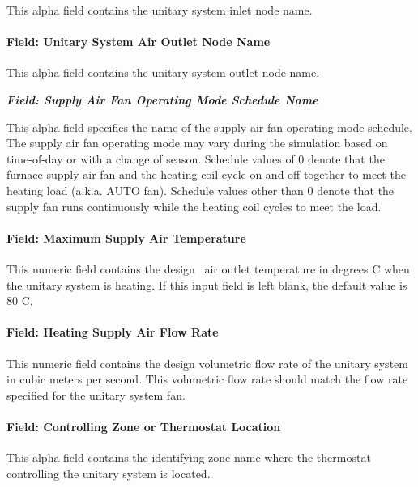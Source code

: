 This alpha field contains the unitary system inlet node name.

\paragraph{Field: Unitary System Air Outlet Node Name}\label{field-unitary-system-air-outlet-node-name-2}

This alpha field contains the unitary system outlet node name.

\textbf{\emph{Field: Supply Air Fan Operating Mode Schedule Name}}

This alpha field specifies the name of the supply air fan operating mode schedule. The supply air fan operating mode may vary during the simulation based on time-of-day or with a change of season. Schedule values of 0 denote that the furnace supply air fan and the heating coil cycle on and off together to meet the heating load (a.k.a. AUTO fan). Schedule values other than 0 denote that the supply fan runs continuously while the heating coil cycles to meet the load.

\paragraph{Field: Maximum Supply Air Temperature}\label{field-maximum-supply-air-temperature-4}

This numeric field contains the design~ air outlet temperature in degrees C when the unitary system is heating. If this input field is left blank, the default value is 80 C.

\paragraph{Field: Heating Supply Air Flow Rate}\label{field-heating-supply-air-flow-rate-5-000}

This numeric field contains the design volumetric flow rate of the unitary system in cubic meters per second. This volumetric flow rate should match the flow rate specified for the unitary system fan.

\paragraph{Field: Controlling Zone or Thermostat Location}\label{field-controlling-zone-or-thermostat-location-6}

This alpha field contains the identifying zone name where the thermostat controlling the unitary system is located.

